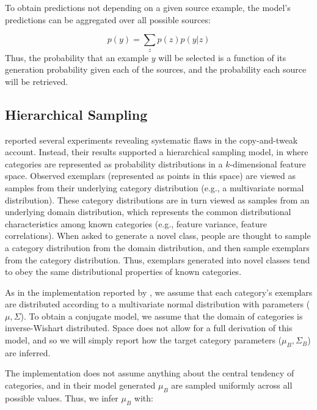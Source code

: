 \documentclass[10pt,letterpaper]{article}
\begin{document}
To obtain predictions not depending on a given source example, the model's predictions can be aggregated over all possible sources:

\begin{equation}
  p(y) = \sum_z{p(z)p(y|z) }
\end{equation}
% 
Thus, the probability that an example $y$ will be selected is a function of its generation probability given each of the sources, and the probability each source will be retrieved.


\subsection{Hierarchical Sampling}

\citet{jern2013probabilistic} reported several experiments revealing systematic flaws in the copy-and-tweak account. Instead, their results supported a hierarchical sampling model, in where categories are represented as probability distributions in a $k$-dimensional feature space. Observed exemplars (represented as points in this space) are viewed as samples from their underlying category distribution (e.g., a multivariate normal distribution). These category distributions are in turn viewed as samples from an underlying domain distribution, which represents the common distributional characteristics among known categories (e.g., feature variance, feature correlations). When asked to generate a novel class, people are thought to sample a category distribution from the domain distribution, and then sample exemplars from the category distribution. Thus, exemplars generated into novel classes tend to obey the same distributional properties of known categories. 

As in the implementation reported by \cite{jern2013probabilistic}, we assume that each category's exemplars are distributed according to a multivariate normal distribution with parameters ($\mu, \Sigma$). To obtain a conjugate model, we assume that the domain of categories is inverse-Wishart distributed. Space does not allow for a full derivation of this model, and so we will simply report how the target category parameters ($\mu_B, \Sigma_B$) are inferred.

The \citet{jern2013probabilistic} implementation does not assume anything about the central tendency of categories, and in their model generated $\mu_B$ are sampled uniformly across all possible values. Thus, we infer $\mu_B$ with:
\end{document}
